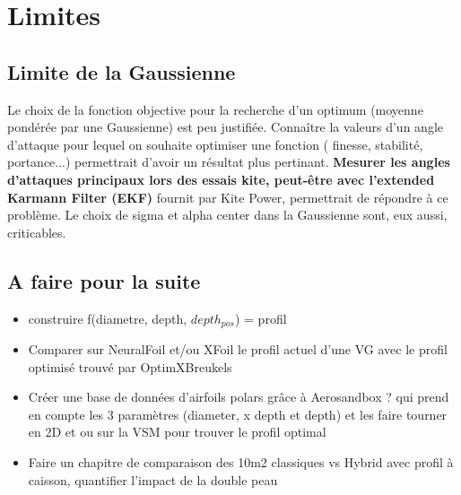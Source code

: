 
\chapter{Limites} 	
\label{Chapter5} 		


\section{Limite de la Gaussienne}
\label{sec:Ch4.1}

Le choix de la fonction objective pour la recherche d'un optimum (moyenne pondérée par une Gaussienne) est peu justifiée. Connaître la valeurs d'un angle d'attaque pour lequel on souhaite optimiser une fonction ( finesse, stabilité, portance...) permettrait d'avoir un résultat plus pertinant. \textbf{Mesurer les angles d'attaques principaux lors des essais kite, peut-être avec l'extended Karmann Filter (EKF)} fournit par Kite Power, permettrait de répondre à ce problème. Le choix de sigma et alpha center dans la Gaussienne sont, eux aussi, criticables.\\




\section{A faire pour la suite}
\label{sec:Ch4.2}

\begin{itemize}
    \item construire f(diametre, depth, $depth_{pos}$) = profil
    \item Comparer sur NeuralFoil et/ou XFoil le profil actuel d’une VG avec le profil optimisé trouvé par OptimXBreukels
    \item Créer une base de données d'airfoils polars grâce à Aerosandbox ? qui prend en compte les 3 paramètres (diameter, x depth et depth) et les faire tourner en 2D et ou sur la VSM pour trouver le profil optimal
    \item Faire un chapitre de comparaison des 10m2 classiques vs Hybrid avec profil à caisson, quantifier l'impact de la double peau
\end{itemize}